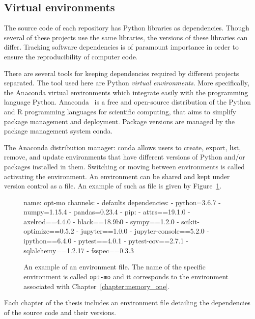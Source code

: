 \subsection{Virtual environments}

The source code of each repository has Python libraries as dependencies. Though
several of these projects use the same libraries, the versions of these
libraries can differ. Tracking software dependencies is of paramount importance
in order to ensure the reproducibility of computer code.

There are several tools for keeping dependencies required by different projects
separated. The tool used here are Python \textit{virtual environments}. More
specifically, the Anaconda virtual environments which integrate easily with the
programming language Python. Anaconda~\cite{anaconda} is a free and open-source distribution of
the Python and R programming languages for scientific computing, that aims to
simplify package management and deployment. Package versions are managed by the
package management system conda.

The Anaconda
distribution manager: conda allows users to create, export, list, remove, and update environments that
have different versions of Python and/or packages installed in them. Switching
or moving between environments is called activating the environment. An environment
can be shared and kept under version control as a file. An example of
such as file is given by Figure~\ref{fig:environment_file}.

\begin{figure}
\begin{shell}
name: opt-mo
channels:
  - defaults
dependencies:
  - python=3.6.7
  - numpy=1.15.4
  - pandas=0.23.4
  - pip:
    - attrs==19.1.0
    - axelrod==4.4.0
    - black==18.9b0
    - sympy==1.2.0
    - scikit-optimize==0.5.2
    - jupyter==1.0.0
    - jupyter-console==5.2.0
    - ipython==6.4.0
    - pytest==4.0.1
    - pytest-cov==2.7.1
    - sqlalchemy==1.2.17
    - fsspec==0.3.3
\end{shell}
\caption{An example of an environment file. The name of the specific environment is called
\texttt{opt-mo} and it corresponds to the environment associated with
Chapter~\ref{chapter:memory_one}.}\label{fig:environment_file}
\end{figure}

Each chapter of the thesis includes an environment file detailing the dependencies
of the source code and their versions.

